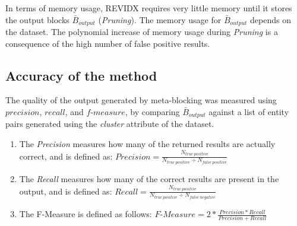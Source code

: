\documentclass[a4paper,12pt]{article}
\begin{document}
\begin{center}
\end{center}

In terms of memory usage, REVIDX requires very little memory until it stores the output blocks $\bar B_{output}$ (\emph{Pruning}). The memory usage for $\bar B_{output}$ depends on the dataset. The polynomial increase of memory usage during \emph{Pruning} is a consequence of the high number of false positive results.

\begin{center}
\end{center}

\newpage
\subsection{Accuracy of the method}
The quality of the output generated by meta-blocking was measured using $precision$, $recall$, and $f\text{-}measure$, by comparing $\bar B_{output}$ against a list of entity pairs generated using the \emph{cluster} attribute of the dataset.
\begin{enumerate}
  \item The \emph{Precision} measures how many of the returned results are actually correct, and is defined as: $Precision = \frac{N_{true\ positive}}{N_{true\ positive} \div N_{false\ positive}}$
  \item The \emph{Recall} measures how many of the correct results are present in the output, and is defined as: $Recall = \frac{N_{true\ positive}}{N_{true\ positive} \div N_{false\ negative}}$
  \item The F-Measure is defined as follows: $F\text{-}Measure = 2*\frac{Precision * Recall}{Precision + Recall}$
\end{enumerate}
\end{document}
